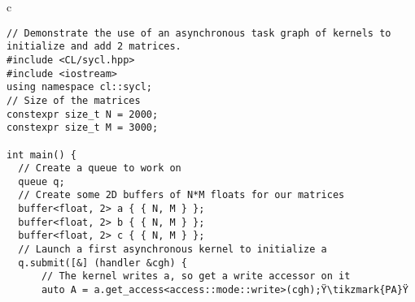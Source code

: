 \documentclass[sigplan, review, authordraft]{acmart}
\begin{document}
\begin{figure*}
  \begin{tabular}{c}
    \begin{lstlisting}[basicstyle=\scriptsize,name=example]
// Demonstrate the use of an asynchronous task graph of kernels to initialize and add 2 matrices.
#include <CL/sycl.hpp>
#include <iostream>
using namespace cl::sycl;
// Size of the matrices
constexpr size_t N = 2000;
constexpr size_t M = 3000;

int main() {
  // Create a queue to work on
  queue q;
  // Create some 2D buffers of N*M floats for our matrices
  buffer<float, 2> a { { N, M } };
  buffer<float, 2> b { { N, M } };
  buffer<float, 2> c { { N, M } };
  // Launch a first asynchronous kernel to initialize a
  q.submit([&] (handler &cgh) {
      // The kernel writes a, so get a write accessor on it
      auto A = a.get_access<access::mode::write>(cgh);Ÿ\tikzmark{PA}Ÿ


\end{lstlisting}
\end{tabular}
\end{figure*}
\end{document}
